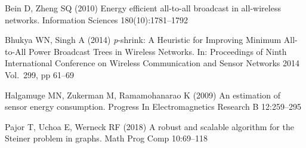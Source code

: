\documentclass[12pt]{article}
\begin{document}
\begin{thebibliography}{}


Bein D, Zheng SQ (2010)
Energy efficient all-to-all broadcast in all-wireless networks.
Information Sciences 180(10):1781--1792

Bhukya WN, Singh A (2014)
\emph{p}-shrink: A Heuristic for Improving Minimum All-to-All Power Broadcast Trees in Wireless Networks.
In: Proceedings of Ninth International Conference on Wireless Communication and Sensor Networks 2014 
Vol.\ 299, pp 61--69

Halgamuge MN, Zukerman M, Ramamohanarao K (2009)
An estimation of sensor energy consumption.
Progress In Electromagnetics Research B 12:259--295

Pajor T, Uchoa E, Werneck RF (2018)
A robust and scalable algorithm for the Steiner problem in graphs.
Math Prog Comp 10:69--118



\end{thebibliography}
\end{document}
